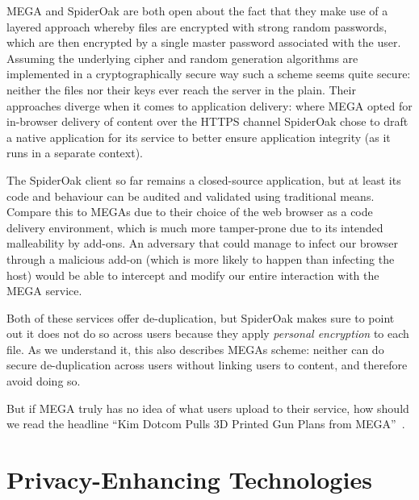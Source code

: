 \documentclass[12pt]{article}
\begin{document}
MEGA and SpiderOak are both open about the fact that they make use of a layered approach whereby files are encrypted with strong random passwords, which are then encrypted by a single master password associated with the user.
Assuming the underlying cipher and random generation algorithms are implemented in a cryptographically secure way such a scheme seems quite secure: neither the files nor their keys ever reach the server in the plain.
Their approaches diverge when it comes to application delivery: where MEGA opted for in-browser delivery of content over the HTTPS channel SpiderOak chose to draft a native application for its service to better ensure application integrity (as it runs in a separate context).

The SpiderOak client so far remains a closed-source application, but at least its code and behaviour can be audited and validated using traditional means.
Compare this to MEGAs due to their choice of the web browser as a code delivery environment, which is much more tamper-prone due to its intended malleability by add-ons.
An adversary that could manage to infect our browser through a malicious add-on (which is more likely to happen than infecting the host) would be able to intercept and modify our entire interaction with the MEGA service.

Both of these services offer de-duplication, but SpiderOak makes sure to point out it does not do so across users because they apply \textit{personal encryption} to each file.
As we understand it, this also describes MEGAs scheme: neither can do secure de-duplication across users without linking users to content, and therefore avoid doing so.

But if MEGA truly has no idea of what users upload to their service, how should we read the headline ``Kim Dotcom Pulls 3D Printed Gun Plans from MEGA''~\cite{3d_gun}.


\section{Privacy-Enhancing Technologies}
\label{sec:pet}
\end{document}
